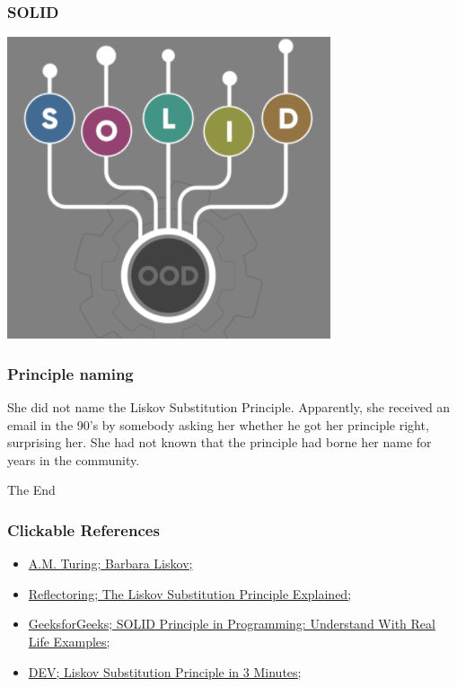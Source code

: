 \documentclass{beamer}
\begin{document}

\begin{frame}
\frametitle{SOLID} 

\includegraphics[scale=0.8, align=centre]{SOLID}
\centering

\end{frame}


\begin{frame}
\frametitle{Principle naming}
She did not name the Liskov Substitution Principle. Apparently, she received an email in the 90’s by somebody asking her whether he got her principle right, surprising her. She had not known that the principle had borne her name for years in the community.
\end{frame}


\begin{frame}
\Huge{\centerline{The End}}
\end{frame}


\begin{frame}
\frametitle{Clickable References}
\begin{itemize}
\item \href{https://amturing.acm.org/award_winners/liskov_1108679.cfm}{ A.M. Turing; Barbara Liskov;} 

\item \href{https://reflectoring.io/lsp-explained/}{ Reflectoring; The Liskov Substitution Principle Explained;}

\item \href{https://www.geeksforgeeks.org/solid-principle-in-programming-understand-with-real-life-e}{GeeksforGeeks; SOLID Principle in Programming: Understand With Real Life Examples;}


\item \href{https://dev.to/erikwhiting88/liskov-substitution-principle-in-3-minutes-2}{DEV; Liskov Substitution Principle in 3 Minutes;}

\end{itemize}
\end{frame}
\end{document}
